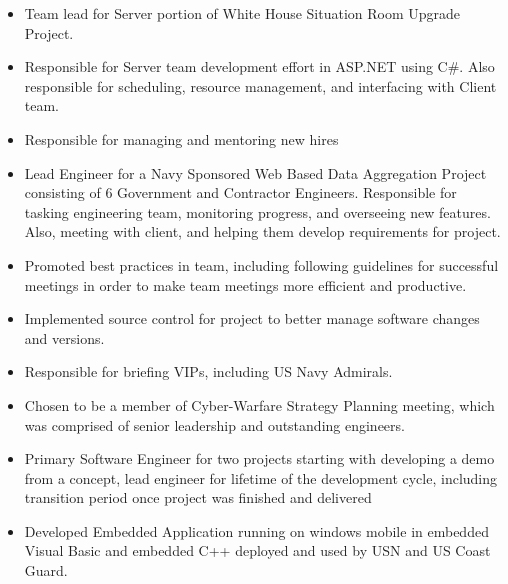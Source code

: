 \documentclass[a4paper, oneside, final, 10pt]{scrartcl}
\begin{document}

\begin{itemize}
  \item Team lead for Server portion of White House Situation Room Upgrade Project.
  \item Responsible for Server team development effort in ASP.NET using C\#. Also responsible for scheduling, resource management, and interfacing with Client team. 
  \item Responsible for managing and mentoring new hires 
\end{itemize}

\begin{itemize}
  \item Lead Engineer for a Navy Sponsored Web Based Data Aggregation Project consisting of 6 Government and Contractor Engineers.  Responsible for tasking engineering team, monitoring progress, and overseeing new features. Also, meeting with client, and helping them develop requirements for project.  
  \item Promoted best practices in team, including following guidelines for successful meetings in order to make team meetings more efficient and productive. 
  \item Implemented source control for project to better manage software changes and versions.
  \item Responsible for briefing VIPs, including US Navy Admirals.
  \item Chosen to be a member of Cyber-Warfare Strategy Planning meeting, which was comprised of senior leadership and outstanding engineers.
\end{itemize}

\begin{itemize}
  \item Primary Software Engineer for two projects starting with developing a demo from a concept, lead engineer for lifetime of the development cycle, including transition period once project was finished and delivered
  \item Developed Embedded Application running on windows mobile in embedded Visual Basic and embedded C++ deployed and used by USN and US Coast Guard.
\end{itemize}
\end{document}
